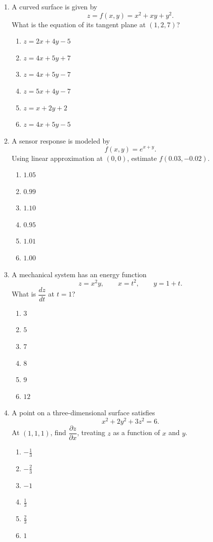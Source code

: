 \documentclass[a4paper,12pt]{article}
\theoremstyle{mystyle}
\numberwithin{equation}{section}
\numberwithin{theorem}{section}
\numberwithin{proposition}{section}
\numberwithin{example}{section}
\numberwithin{remark}{section}
\numberwithin{lemma}{section}
\numberwithin{corollary}{section}
\numberwithin{definition}{section}
\begin{document}
\begin{enumerate}
\item A curved surface is given by
\[
    z=f(x,y)=x^2+xy+y^2.
\]
What is the equation of its tangent plane at $(1,2,7)$?
\begin{enumerate}
    \item $z=2x+4y-5$
    \item $z=4x+5y+7$
    \item $z=4x+5y-7$
    \item $z=5x+4y-7$
    \item $z=x+2y+2$
    \item $z=4x+5y-5$
\end{enumerate}

\item A sensor response is modeled by
\[
    f(x,y)=e^{x+y}.
\]
Using linear approximation at $(0,0)$, estimate $f(0.03,-0.02)$.
\begin{enumerate}
    \item $1.05$
    \item $0.99$
    \item $1.10$
    \item $0.95$
    \item $1.01$
    \item $1.00$
\end{enumerate}

\item A mechanical system has an energy function
\[
    z=x^2y,\qquad x=t^2,\qquad y=1+t.
\]
What is $\dfrac{dz}{dt}$ at $t=1$?
\begin{enumerate}
    \item $3$
    \item $5$
    \item $7$
    \item $8$
    \item $9$
    \item $12$
\end{enumerate}

\item A point on a three-dimensional surface satisfies
\[
    x^2+2y^2+3z^2=6.
\]
At $(1,1,1)$, find $\dfrac{\partial z}{\partial x}$, treating
$z$ as a function of $x$ and $y$.
\begin{enumerate}
    \item $-\frac13$
    \item $-\frac23$
    \item $-1$
    \item $\frac13$
    \item $\frac23$
    \item $1$
\end{enumerate}


\end{enumerate}
\end{document}
